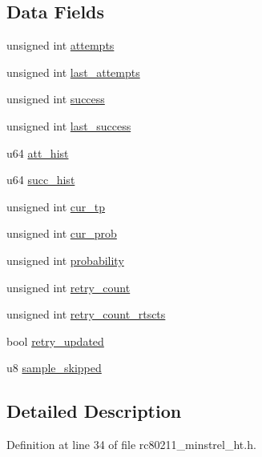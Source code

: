 \subsection*{Data Fields}
\begin{DoxyCompactItemize}
\item 
unsigned int \hyperlink{structminstrel__rate__stats_a8299d4347d9be4e1868c451df3551f7c}{attempts}
\item 
unsigned int \hyperlink{structminstrel__rate__stats_a5a57031309e6917d037f074015ebf051}{last\-\_\-attempts}
\item 
unsigned int \hyperlink{structminstrel__rate__stats_a5813e0a68f3d46257469abc8784b8e22}{success}
\item 
unsigned int \hyperlink{structminstrel__rate__stats_a759724fa6afe27569c1f129ff4708e47}{last\-\_\-success}
\item 
u64 \hyperlink{structminstrel__rate__stats_ad1e0131b84d34b871828347daa221112}{att\-\_\-hist}
\item 
u64 \hyperlink{structminstrel__rate__stats_af2ad78ee531872588a173945378c1b51}{succ\-\_\-hist}
\item 
unsigned int \hyperlink{structminstrel__rate__stats_a4e2d3748d37ceaeb025df1d77052c809}{cur\-\_\-tp}
\item 
unsigned int \hyperlink{structminstrel__rate__stats_a87a247add3a9e2f9416b9cb6f9a5bc98}{cur\-\_\-prob}
\item 
unsigned int \hyperlink{structminstrel__rate__stats_a68975779708d4e8687d8f500cd1e2e61}{probability}
\item 
unsigned int \hyperlink{structminstrel__rate__stats_aa01b3f9d6a9f63eb01422e4783c64f09}{retry\-\_\-count}
\item 
unsigned int \hyperlink{structminstrel__rate__stats_ade58922c4f5867f4871e88d7d53c92fe}{retry\-\_\-count\-\_\-rtscts}
\item 
bool \hyperlink{structminstrel__rate__stats_afe4f0bbc7c9792a73c06d4cd49a7eda1}{retry\-\_\-updated}
\item 
u8 \hyperlink{structminstrel__rate__stats_a3ef5f3da43bcca6331c539dc59d39b72}{sample\-\_\-skipped}
\end{DoxyCompactItemize}


\subsection{Detailed Description}


Definition at line 34 of file rc80211\-\_\-minstrel\-\_\-ht.\-h.



